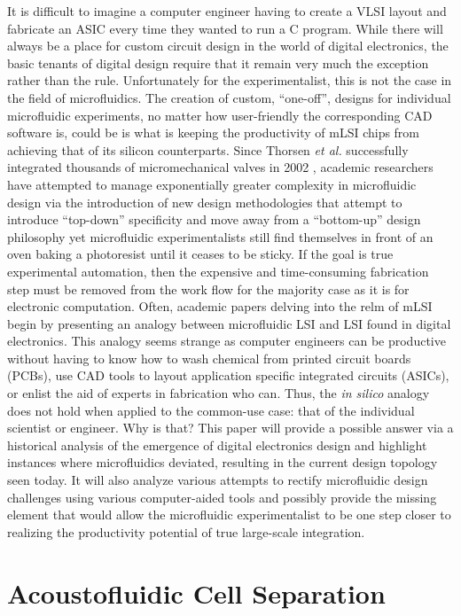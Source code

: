 It is difficult to imagine a computer engineer having to create a VLSI layout and fabricate an ASIC every time they wanted to run a C program. While there will always be a place for custom circuit design in the world of digital electronics, the basic tenants of digital design require that it remain very much the exception rather than the rule. Unfortunately for the experimentalist, this is not the case in the field of microfluidics. The creation of custom, ``one-off'', designs for individual microfluidic experiments, no matter how user-friendly the corresponding CAD software is, could be is what is keeping the productivity of mLSI chips from achieving that of its silicon counterparts. Since Thorsen \emph{et al.} successfully integrated thousands of micromechanical valves in 2002 \cite{thorsen2002}, academic researchers have attempted to manage exponentially greater complexity in microfluidic design via the introduction of new design methodologies that attempt to introduce ``top-down'' specificity and move away from a ``bottom-up'' design philosophy \cite{minhass2013}\cite{melin2007}\cite{minhass2012} yet microfluidic experimentalists still find themselves in front of an oven baking a photoresist until it ceases to be sticky. If the goal is true experimental automation, then the expensive and time-consuming fabrication step must be removed from the work flow for the majority case as it is for electronic computation. Often, academic papers delving into the relm of mLSI begin by presenting an analogy between microfluidic LSI and LSI found in digital electronics. This analogy seems strange as computer engineers can be productive without having to know how to wash chemical from printed circuit boards (PCBs), use CAD tools to layout application specific integrated circuits (ASICs), or enlist the aid of experts in fabrication who can. Thus, the \emph{in silico} analogy does not hold when applied to the common-use case: that of the individual scientist or engineer. Why is that? This paper will provide a possible answer via a historical analysis of the emergence of digital electronics design and highlight instances where microfluidics deviated, resulting in the current design topology seen today. It will also analyze various attempts to rectify microfluidic design challenges using various computer-aided tools and possibly provide the missing element that would allow the microfluidic experimentalist to be one step closer to realizing the productivity potential of true large-scale integration. 



\section{Acoustofluidic Cell Separation}
\label{sec:cellSep}
